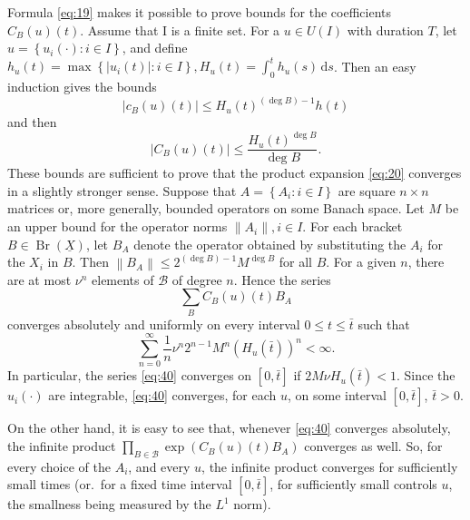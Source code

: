 \documentclass[leqno]{article}
\theoremstyle{plain}
\newcommand{\dd}{\,\mathrm{d}}
\newcommand{\Br}{\operatorname{Br}(\underline{X})}
\begin{document}
Formula \eqref{eq:19} makes it possible to prove bounds for the coefficients $C_{B}(u)(t)$. Assume that I is a finite set. For a $u \in U(I)$ with duration $T$, let $u=\left\{u_{i}(\cdot): i \in I\right\}$, and define $h_{u}(t)=\max \left\{\left|u_{i}(t)\right|: i \in I\right\}, H_{u}(t)=\int_{0}^{t} h_{u}(s) \dd s$. Then an easy induction gives the bounds
\begin{equation}
	\left|c_{B}(u)(t)\right| \leq H_{u}(t)^{(\operatorname{deg} B)-1}{h(t)}
\end{equation}
and then
\begin{equation} \label{eq:39}
	\left|C_{B}(u)(t)\right| \leq \frac{H_{u}(t)^{\operatorname{deg} B}}{\operatorname{deg} B} .
\end{equation}
These bounds are sufficient to prove that the product expansion \eqref{eq:20} converges in a slightly stronger sense. 
Suppose that $A=\left\{A_{i}: i \in I\right\}$ are square $n \times n$ matrices or, more generally, bounded operators on some Banach space. Let $M$ be an upper bound for the operator norms $\left\|A_{i}\right\|, i \in I$. For each bracket $B \in \Br$, let $B_{A}$ denote the operator obtained by substituting the $A_{i}$ for the $X_{i}$ in $B$. Then $\left\|B_{A}\right\| \leq 2^{(\operatorname{deg} B)-1} M^{\operatorname{deg} B}$ for all $B$. For a given $n$, there are at most $\nu^{n}$ elements of $\mathcal{B}$ of degree $n$. Hence the series
\begin{equation} \label{eq:40}
	\sum_{B} C_{B}(u)(t) B_{A}
\end{equation}
converges absolutely and uniformly on every interval $0 \leq t \leq \bar{t}$ such that
\begin{equation}
	\sum_{n=0}^{\infty} \frac{1}{n} \nu^{n} 2^{n-1} M^{n} (H_{u}(\bar{t}))^{n}<\infty .
\end{equation}
In particular, the series \eqref{eq:40} converges on $[0, \bar{t}]$ if $2 M \nu H_{u}(\bar{t})<1$. 
Since the $u_{i}(\cdot)$ are integrable, \eqref{eq:40} converges, for each $u$, on some interval $[0, \bar{t}]$, $\bar{t}>0$.

On the other hand, it is easy to see that, whenever \eqref{eq:40} converges absolutely, the infinite product $\prod_{B \in \mathcal{B}} \exp ( C_{B}(u)(t) B_{A})$ converges as well. 
So, for every choice of the $A_{i}$, and every $u$, the infinite product converges for sufficiently small times (or.\ for a fixed time interval $[0, \bar{t}]$, for sufficiently small controls $u$, the smallness being measured by the $L^1$ norm).
\end{document}
